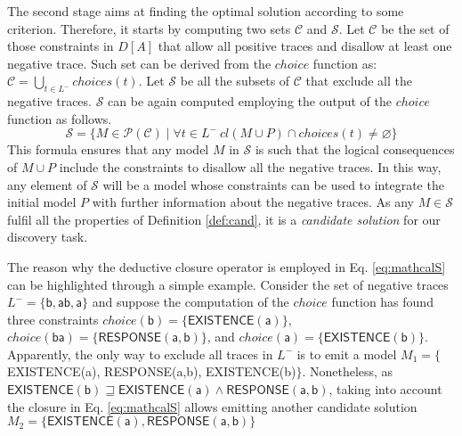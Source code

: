 
The second stage aims at finding the optimal solution according to some criterion. Therefore, it starts by computing two sets $\mathcal{C}$ and $\mathcal{S}$. 
%
Let $\mathcal{C}$ be the set of those constraints in $D[A]$ that allow all positive traces and disallow at least one negative trace. Such set can be derived from the $choice$ function as: $\mathcal{C} = \bigcup_{t\in L^-} choices(t)$.
%
Let $\mathcal{S}$ be all the subsets of $\mathcal{C}$ that exclude all the negative traces. $\mathcal{S}$ can be again computed employing the output of the $choice$ function as follows. 
\begin{equation}
\mathcal{S}=\{M\in\mathcal{P}(\mathcal{C})\mid \forall t\in L^-~ cl(M\cup P)\cap choices(t)\neq \varnothing\} \label{eq:mathcalS}
\end{equation}
This formula ensures that any model $M$ in $\mathcal{S}$ is such that the logical consequences of $M \cup P$ include the constraints to disallow all the negative traces. In this way, any element of $\mathcal{S}$ will be a model whose constraints can be used to integrate the initial model $P$ with further information about the negative traces. As any $M \in \mathcal{S}$ fulfil all the properties of Definition \ref{def:cand}, it is a \emph{candidate solution} for our discovery task.

The reason why the deductive closure operator is employed in Eq. \ref{eq:mathcalS} can be highlighted through a simple example. Consider the set of negative traces $L^-=\{\mathsf{b, ab, a}\}$ and suppose the computation of the ${choice}$ function has found three constraints $choice(\mathsf{b})=\{\mathsf{EXISTENCE(a)}\}$, $choice(\mathsf{ba})=\{\mathsf{RESPONSE(a,b)}\}$, and $choice(\mathsf{a})=\{\mathsf{EXISTENCE(b)}\}$. Apparently, the only way to exclude all traces in $L^-$ is to emit a model $M_1=\{$\textsf{EXISTENCE(a), RESPONSE(a,b), EXISTENCE(b)}$\}$. Nonetheless, as 
$\mathsf{EXISTENCE(b)} \sqsupseteq \mathsf{EXISTENCE(a)} \land  \mathsf{RESPONSE(a,b)}$, 
taking into account the closure in Eq. \ref{eq:mathcalS} allows emitting another candidate solution $M_2=\{\mathsf{EXISTENCE(a), RESPONSE(a,b)}\}$

